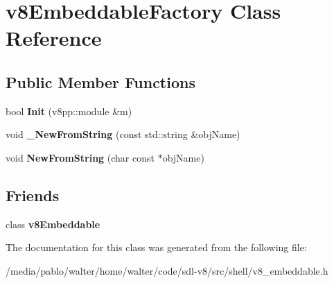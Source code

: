 \hypertarget{classv8EmbeddableFactory}{}\section{v8\+Embeddable\+Factory Class Reference}
\label{classv8EmbeddableFactory}
\subsection*{Public Member Functions}
\begin{DoxyCompactItemize}
\item 
\mbox{\label{classv8EmbeddableFactory_a4cff6260b70097f882a4a40303a9b4a1}} 
bool {\bfseries Init} (v8pp\+::module \&m)
\item 
\mbox{\label{classv8EmbeddableFactory_a075bcba6cb06f440a8fe030a5095869b}} 
void {\bfseries \+\_\+\+New\+From\+String} (const std\+::string \&obj\+Name)
\item 
\mbox{\label{classv8EmbeddableFactory_a4b68040657854d2e91d676f8567065f4}} 
void {\bfseries New\+From\+String} (char const $\ast$obj\+Name)
\end{DoxyCompactItemize}
\subsection*{Friends}
\begin{DoxyCompactItemize}
\item 
\mbox{\label{classv8EmbeddableFactory_aa52a421323b2a4ac5318aa3f5237fada}} 
class {\bfseries v8\+Embeddable}
\end{DoxyCompactItemize}


The documentation for this class was generated from the following file\+:\begin{DoxyCompactItemize}
\item 
/media/pablo/walter/home/walter/code/sdl-\/v8/src/shell/v8\+\_\+embeddable.\+h\end{DoxyCompactItemize}
